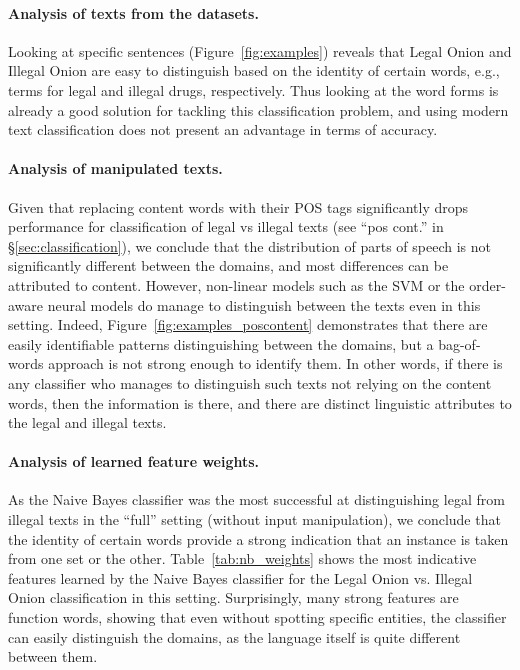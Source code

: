 \documentclass[11pt,a4paper,table]{article}
\begin{document}
{\paragraph{Analysis of texts from the datasets.}

Looking at specific sentences (Figure~\ref{fig:examples})
reveals that Legal Onion and Illegal Onion are easy to distinguish
based on the identity of certain words, e.g., terms for legal and illegal drugs,
respectively.
Thus looking at the word forms is already a good solution for tackling this
classification problem,
and using modern text classification does not present an advantage in
terms of accuracy.

\paragraph{Analysis of manipulated texts.}

Given that replacing content words with their POS tags significantly drops
performance for classification of legal vs illegal texts
(see ``pos cont.'' in \S\ref{sec:classification}),
we conclude that the distribution of parts of speech is not significantly
different between the domains,
and most differences can be attributed to content.
However, non-linear models such as the SVM or the order-aware neural models
do manage to distinguish between the texts even in this setting.
Indeed, Figure~\ref{fig:examples_poscontent} demonstrates that
there are easily identifiable patterns distinguishing between the domains,
but a bag-of-words approach is not strong enough to identify them. In other words, if there is any classifier who manages to distinguish such texts not relying on the content words, then the information is there, and there are distinct linguistic attributes to the legal and illegal texts. 

\paragraph{Analysis of learned feature weights.}

As the Naive Bayes classifier was the most successful at distinguishing
legal from illegal texts in the ``full'' setting (without input manipulation),
we conclude that the identity of certain words provide a strong indication
that an instance is taken from one set or the other.
Table~\ref{tab:nb_weights} shows the most indicative features learned
by the Naive Bayes classifier for the
Legal Onion vs. Illegal Onion classification in this setting.
Surprisingly, many strong features are function words,
showing that even without spotting specific entities,
the classifier can easily distinguish the domains, as the language itself
is quite different between them.

}
\end{document}
